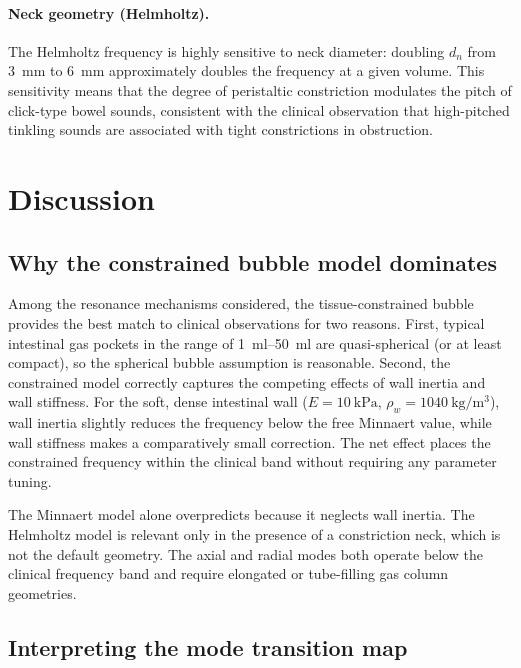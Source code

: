 \documentclass[review]{elsarticle}
\begin{document}
\paragraph{Neck geometry (Helmholtz).}
The Helmholtz frequency is highly sensitive to neck diameter: doubling $d_n$
from \SI{3}{\milli\metre} to \SI{6}{\milli\metre} approximately doubles the
frequency at a given volume.  This sensitivity means that the degree of
peristaltic constriction modulates the pitch of click-type bowel sounds,
consistent with the clinical observation that high-pitched tinkling sounds
are associated with tight constrictions in obstruction.

\section{Discussion}
\label{sec:discussion}

\subsection{Why the constrained bubble model dominates}
\label{sec:why_constrained}

Among the resonance mechanisms considered, the tissue-constrained bubble
provides the best match to clinical observations for two reasons.  First,
typical intestinal gas pockets in the range of
\SIrange{1}{50}{\milli\litre} are quasi-spherical (or at least compact), so
the spherical bubble assumption is reasonable.  Second, the constrained model
correctly captures the competing effects of wall inertia and wall stiffness.
For the soft, dense intestinal wall ($E = \SI{10}{\kilo\pascal}$,
$\rho_w = \SI{1040}{\kilogram\per\metre\cubed}$), wall inertia slightly
reduces the frequency below the free Minnaert value, while wall stiffness
makes a comparatively small correction.  The net effect places the
constrained frequency within the clinical band without requiring any
parameter tuning.

The Minnaert model alone overpredicts because it neglects wall inertia.  The
Helmholtz model is relevant only in the presence of a constriction neck, which
is not the default geometry.  The axial and radial modes both operate below the clinical
frequency band and require elongated or tube-filling gas column geometries.

\subsection{Interpreting the mode transition map}
\label{sec:interpreting_map}
\end{document}

